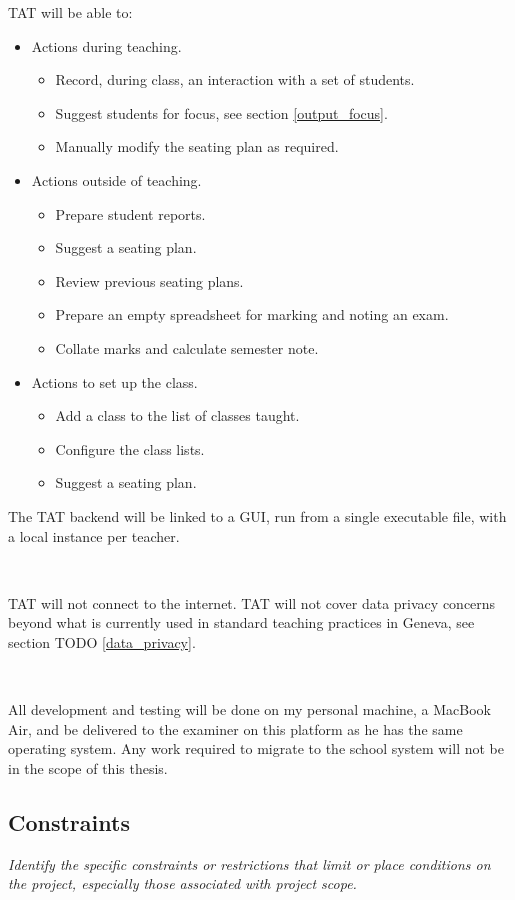 \documentclass[10pt]{article}
\begin{document}
TAT will be able to:
\begin{itemize}
\item Actions during teaching.
\begin{itemize}
  \item Record, during class, an interaction with a set of students.
  \item Suggest students for focus, see section \ref{output_focus}.
  \item Manually modify the seating plan as required.
 \end{itemize}
 \item Actions outside of teaching.
 \begin{itemize}
  \item Prepare student reports.
  \item Suggest a seating plan.
  \item Review previous seating plans.
  \item Prepare an empty spreadsheet for marking and noting an exam.
  \item Collate marks and calculate semester note.
\end{itemize}
\item Actions to set up the class.
\begin{itemize}
  \item Add a class to the list of classes taught.
  \item Configure the class lists.
  \item Suggest a seating plan.
\end{itemize}
\end{itemize}

The TAT backend will be linked to a GUI, run from a single executable file, with a local instance per teacher.

\

TAT will not connect to the internet. TAT will not cover data privacy concerns beyond what is currently used in standard teaching practices in Geneva, see section TODO \ref{data_privacy}.

\

All development and testing will be done on my personal machine, a MacBook Air, and be delivered to the examiner on this platform as he has the same operating system. Any work required to migrate to the school system will not be in the scope of this thesis.

\subsection{Constraints} 
\emph{Identify the specific constraints or restrictions that limit or place conditions on the project, especially those associated with project scope.}
\end{document}
